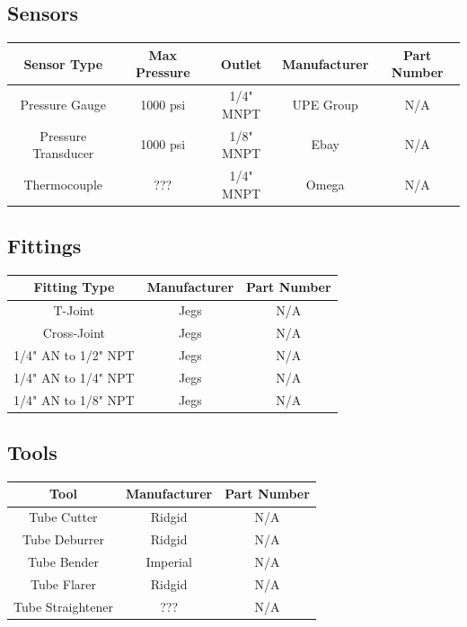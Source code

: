 \documentclass[9pt]{article} %
\numberwithin{equation}{section} %
\begin{document}
\subsection{Sensors}
\begin{center}
 \begin{tabular}{|c c c c c|} 
 \hline
 Sensor Type & Max Pressure & Outlet & Manufacturer & Part Number\\
 \hline\hline
 Pressure Gauge & 1000 psi & 1/4" MNPT & UPE Group & N/A\\ 
 \hline
 Pressure Transducer & 1000 psi & 1/8" MNPT & Ebay & N/A\\
 \hline
 Thermocouple & ??? & 1/4" MNPT & Omega & N/A\\ 
 \hline
\end{tabular}
\end{center}

\subsection{Fittings}
\begin{center}
 \begin{tabular}{|c c c|} 
 \hline
 Fitting Type & Manufacturer & Part Number\\
 \hline\hline
 T-Joint & Jegs & N/A\\ 
 \hline
 Cross-Joint & Jegs & N/A\\
 \hline
 1/4" AN to 1/2" NPT & Jegs & N/A\\
 \hline
 1/4" AN to 1/4" NPT & Jegs & N/A\\ 
 \hline
 1/4" AN to 1/8" NPT & Jegs & N/A\\
 \hline
\end{tabular}
\end{center}

\subsection{Tools}

\begin{center}
 \begin{tabular}{|c c c|} 
 \hline
 Tool & Manufacturer & Part Number\\
 \hline\hline
 Tube Cutter & Ridgid & N/A\\ 
 \hline
 Tube Deburrer & Ridgid & N/A\\
 \hline
 Tube Bender & Imperial & N/A\\
 \hline
 Tube Flarer & Ridgid & N/A\\
 \hline
 Tube Straightener & ??? & N/A\\ [0.5ex]
 \hline
\end{tabular}
\end{center}
\end{document}
